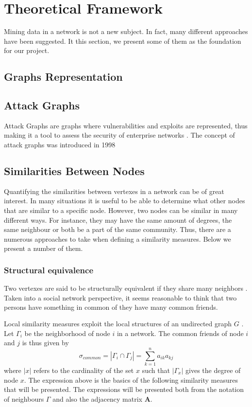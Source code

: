 \chapter{Theoretical Framework}
Mining data in a network is not a new subject. In fact, many different approaches have been suggested. It this section, we present some of them as the foundation for our project.

\section{Graphs Representation}


\section{Attack Graphs}
Attack Graphs are graphs where vulnerabilities and exploits are represented, thus making it a tool to assess the security of enterprise networks \cite{barik2016}. The concept of attack graphs was introduced in 1998 

\section{Similarities Between Nodes \label{sim}}
Quantifying the similarities between vertexes in a network can be of great interest. In many situations it is useful to be able to determine what other nodes that are similar to a specific node. However, two nodes can be similar in many different ways. For instance, they may have the same amount of degrees, the same neighbour or both be a part of the same community. Thus, there are a numerous approaches to take when defining a similarity measures. Below we present a number of them. 

\subsection{Structural equivalence}
Two vertexes are said to be structurally equivalent if they share many neighbors \cite{leicht2006}. Taken into a social network perspective, it seems reasonable to think that two persons have something in common of they have many common friends. 

Local similarity measures exploit the local structures of an undirected graph $G$ \cite{fouss2016algorithms}. Let $\Gamma_i$ be the neighborhood of node $i$ in a network. The common friends of node $i$ and $j$ is thus given by
\begin{equation}
\label{common}
\sigma_{common} = |\Gamma_i \cap \Gamma_j| = \sum_{k=1}^n a_{ik}a_{kj}
\end{equation}
where $|x|$ refers to the cardinality of the set $x$ such that $|\Gamma_x |$ gives the degree of node $x$. The expression above is the basics of the following similarity measures that will be presented. The expressions will be presented both from the notation of neighbours $\Gamma$ and also the adjacency matrix $\textbf{A}$.

